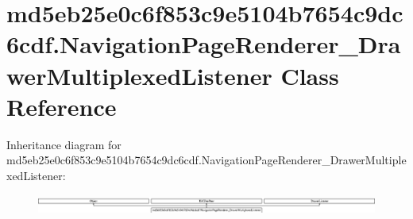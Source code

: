 \hypertarget{classmd5eb25e0c6f853c9e5104b7654c9dc6cdf_1_1NavigationPageRenderer__DrawerMultiplexedListener}{}\section{md5eb25e0c6f853c9e5104b7654c9dc6cdf.\+Navigation\+Page\+Renderer\+\_\+\+Drawer\+Multiplexed\+Listener Class Reference}
\label{classmd5eb25e0c6f853c9e5104b7654c9dc6cdf_1_1NavigationPageRenderer__DrawerMultiplexedListener}
Inheritance diagram for md5eb25e0c6f853c9e5104b7654c9dc6cdf.\+Navigation\+Page\+Renderer\+\_\+\+Drawer\+Multiplexed\+Listener\+:\begin{figure}[H]
\begin{center}
\leavevmode
\includegraphics[height=0.660767cm]{classmd5eb25e0c6f853c9e5104b7654c9dc6cdf_1_1NavigationPageRenderer__DrawerMultiplexedListener}
\end{center}
\end{figure}

